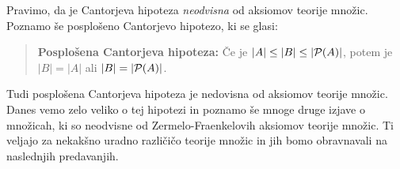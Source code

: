 Pravimo, da je Cantorjeva hipoteza \emph{neodvisna} od aksiomov teorije množic. Poznamo še posplošeno Cantorjevo hipotezo, ki se glasi:
%
\begin{quote}
  \textbf{Posplošena Cantorjeva hipoteza:}
  Če je $|A| \leq |B| \leq |\mathcal{P}(A)|$, potem je $|B| = |A|$ ali $|B| = |\mathcal{P}(A)|$.
\end{quote}
%
Tudi posplošena Cantorjeva hipoteza je nedovisna od aksiomov teorije množic.
Danes vemo zelo veliko o tej hipotezi in poznamo še mnoge druge izjave o množicah, ki so neodvisne od Zermelo-Fraenkelovih aksiomov teorije množic.
Ti veljajo za nekakšno uradno različičo teorije množic in jih bomo obravnavali na naslednjih predavanjih.

